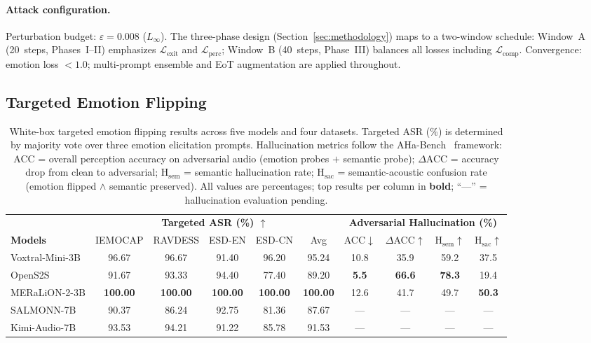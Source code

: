 \paragraph{Attack configuration.}
Perturbation budget: $\varepsilon = 0.008$ ($L_\infty$).
The three-phase design (Section~\ref{sec:methodology}) maps to a two-window schedule: Window~A (20~steps, Phases~I--II) emphasizes $\mathcal{L}_{\mathrm{exit}}$ and $\mathcal{L}_{\mathrm{perc}}$; Window~B (40~steps, Phase~III) balances all losses including $\mathcal{L}_{\mathrm{comp}}$.
Convergence: emotion loss $<1.0$; multi-prompt ensemble and EoT augmentation are applied throughout.


\subsection{Targeted Emotion Flipping}
\label{sec:exp_asr}

\begin{table}[!t]
\centering
\small
\caption{White-box targeted emotion flipping results across five models and four datasets.
Targeted ASR (\%) is determined by majority vote over three emotion elicitation prompts.
Hallucination metrics follow the AHa-Bench~\cite{aha-bench} framework:
ACC = overall perception accuracy on adversarial audio (emotion probes $+$ semantic probe); $\Delta$ACC = accuracy drop from clean to adversarial; H$_{\text{sem}}$ = semantic hallucination rate; H$_{\text{sac}}$ = semantic-acoustic confusion rate (emotion flipped $\wedge$ semantic preserved).
All values are percentages; top results per column in \textbf{bold}; ``---'' = hallucination evaluation pending.}
\label{tab:main_results}
\setlength{\tabcolsep}{5pt}
\begin{tabular}{l cccc c cccc}
\toprule
 & \multicolumn{5}{c}{\textbf{Targeted ASR (\%) $\uparrow$}} & \multicolumn{4}{c}{\textbf{Adversarial Hallucination (\%)}} \\
\cmidrule(lr){2-6} \cmidrule(lr){7-10}
\textbf{Models} & IEMOCAP & RAVDESS & ESD-EN & ESD-CN & Avg & ACC$\downarrow$ & $\Delta$ACC$\uparrow$ & H$_{\text{sem}}$$\uparrow$ & H$_{\text{sac}}$$\uparrow$ \\
\midrule
Voxtral-Mini-3B & 96.67 & 96.67 & 91.40 & 96.20 & 95.24 & 10.8 & 35.9 & 59.2 & 37.5 \\
OpenS2S         & 91.67 & 93.33 & 94.40 & 77.40 & 89.20 & \textbf{5.5} & \textbf{66.6} & \textbf{78.3} & 19.4 \\
MERaLiON-2-3B   & \textbf{100.00} & \textbf{100.00} & \textbf{100.00} & \textbf{100.00} & \textbf{100.00} & 12.6 & 41.7 & 49.7 & \textbf{50.3} \\
SALMONN-7B      & 90.37 & 86.24 & 92.75 & 81.36 & 87.67 & --- & --- & --- & --- \\
Kimi-Audio-7B   & 93.53 & 94.21 & 91.22 & 85.78 & 91.53 & --- & --- & --- & --- \\
\bottomrule
\end{tabular}
\end{table}

